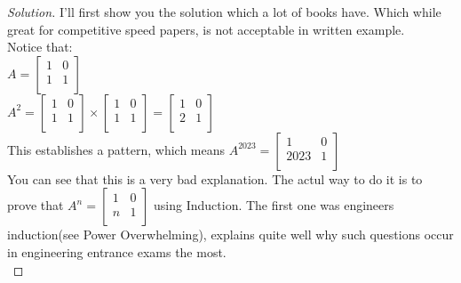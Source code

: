 \begin{proof}
    [Solution]
    I'll first show you the solution which a lot of books have. Which while great for competitive speed papers, is not acceptable in written example.\\
    Notice that:\\
    $A= \begin{bmatrix}
        1 & 0\\
        1 & 1\\
    \end{bmatrix}$\\
    $A^2= \begin{bmatrix}
        1 & 0\\
        1 & 1\\
    \end{bmatrix} \times \begin{bmatrix}
        1 & 0\\
        1 & 1\\
    \end{bmatrix} = \begin{bmatrix}
        1 & 0\\
        2 & 1\\
    \end{bmatrix}$\\
    This establishes a pattern, which means $A^{2023}=\begin{bmatrix}
        1 & 0\\
        2023 & 1\\
    \end{bmatrix}$\\
    You can see that this is a very bad explanation. The actul way to do it is to prove that $A^n=\begin{bmatrix}
        1 & 0\\
        n & 1\\
    \end{bmatrix}$ using Induction. The first one was engineers induction(see Power Overwhelming), explains quite well why such questions occur in engineering entrance exams the most.\\
\end{proof}
